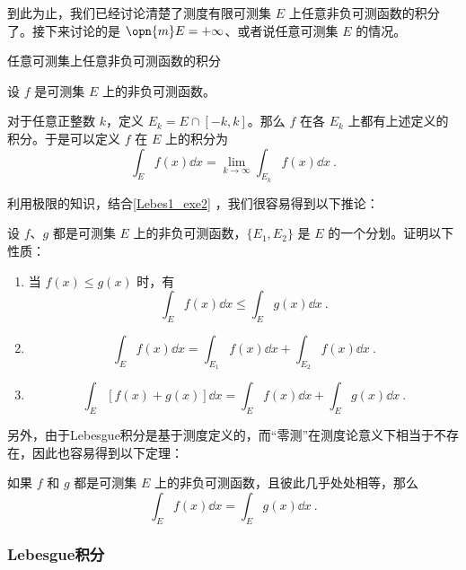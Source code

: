 到此为止，我们已经讨论清楚了测度有限可测集 $E$ 上任意非负可测函数的积分了。接下来讨论的是 $\opn{m}E=+\infty$、或者说任意可测集 $E$ 的情况。

\begin{definition}{任意可测集上任意非负可测函数的积分}

设 $f$ 是可测集 $E$ 上的非负可测函数。

对于任意正整数 $k$，定义 $E_k=E\cap [-k, k]$。那么 $f$ 在各 $E_k$ 上都有上述定义的积分。于是可以定义 $f$ 在 $E$ 上的积分为
\begin{equation}
\int_E f(x) \dd x = \lim\limits_{k\to\infty}\int_{E_k} f(x) \dd x~.
\end{equation}

\end{definition}

利用极限的知识，结合\autoref{Lebes1_exe2} ，我们很容易得到以下推论：

\begin{corollary}{}
设 $f$、$g$ 都是可测集 $E$ 上的非负可测函数，$\{E_1, E_2\}$ 是 $E$ 的一个分划。证明以下性质：
\begin{enumerate}
\item 当 $f(x)\leq g(x)$ 时，有
\begin{equation}
\int_E f(x) \dd x\leq \int_E g(x) \dd x~.
\end{equation}
\item 
\begin{equation}
\int_E f(x) \dd x=\int_{E_1} f(x) \dd x+\int_{E_2} f(x) \dd x~.
\end{equation}
\item 
\begin{equation}
\int_E [f(x)+g(x)] \dd x = \int_E f(x) \dd x+\int_E g(x) \dd x~.
\end{equation}
\end{enumerate}
\end{corollary}

另外，由于Lebesgue积分是基于测度定义的，而“零测”在测度论意义下相当于不存在，因此也容易得到以下定理：

\begin{theorem}{}
如果 $f$ 和 $g$ 都是可测集 $E$ 上的非负可测函数，且彼此几乎处处相等，那么
\begin{equation}
\int_E f(x) \dd x = \int_E g(x) \dd x~.
\end{equation}
\end{theorem}






\subsubsection{Lebesgue积分}

